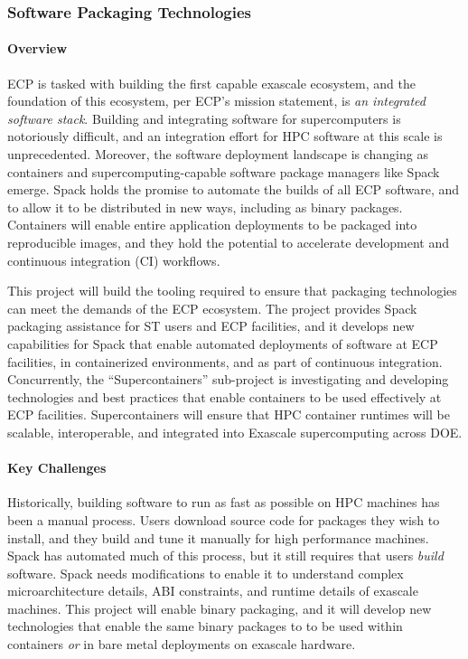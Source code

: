 \subsubsection{ Software Packaging Technologies} \label{subsubsect:sw-packaging}


\paragraph{Overview}

ECP is tasked with building the first capable exascale ecosystem, and the
foundation of this ecosystem, per ECP's mission statement, is {\it an
integrated software stack}.  Building and integrating software for
supercomputers is notoriously difficult, and an integration effort for
HPC software at this scale is unprecedented.  Moreover, the software
deployment landscape is changing as containers and supercomputing-capable
software package managers like Spack emerge.  Spack holds the promise to
automate the builds of all ECP software, and to allow it to be
distributed in new ways, including as binary packages.  Containers will
enable entire application deployments to be packaged into reproducible
images, and they hold the potential to accelerate development and
continuous integration (CI) workflows.

This project will build the tooling required to ensure that packaging
technologies can meet the demands of the ECP ecosystem.  The project
provides Spack packaging assistance for ST users and ECP facilities, and
it develops new capabilities for Spack that enable automated deployments
of software at ECP facilities, in containerized environments, and as part
of continuous integration.  Concurrently, the ``Supercontainers''
sub-project is investigating and developing technologies and best
practices that enable containers to be used effectively at ECP
facilities. Supercontainers will ensure that HPC container runtimes will
be scalable, interoperable, and integrated into Exascale supercomputing
across DOE.


\paragraph{Key Challenges}

Historically, building software to run as fast as possible on HPC
machines has been a manual process.  Users download source code for
packages they wish to install, and they build and tune it manually for
high performance machines. Spack has automated much of this process, but
it still requires that users {\it build} software.  Spack needs
modifications to enable it to understand complex microarchitecture
details, ABI constraints, and runtime details of exascale machines.  This
project will enable binary packaging, and it will develop new
technologies that enable the same binary packages to to be used within
containers {\it or} in bare metal deployments on exascale hardware.


